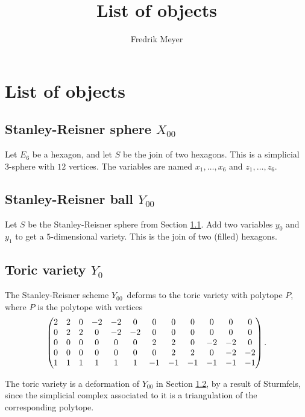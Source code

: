 \documentclass[11pt, english]{article}
\begin{document}
\title{List of objects}
\author{Fredrik Meyer}
\maketitle

\tableofcontents 

\section{List of objects}

\subsection{Stanley-Reisner sphere $X_{00}$}
\label{sec:x00}

Let $E_6$ be a hexagon, and let $S$ be the join of two hexagons. This is a simplicial 3-sphere with $12$ vertices. The variables are named $x_1,\ldots,x_6$ and $z_1,\ldots,z_6$.

\subsection{Stanley-Reisner ball $Y_{00}$}
\label{sec:y00}

Let $S$ be the Stanley-Reisner sphere from Section \ref{sec:x00}. Add two variables $y_0$ and $y_1$ to get a $5$-dimensional variety. This is the join of two (filled) hexagons.

\subsection{Toric variety $Y_0$}
\label{sec:y0}

The Stanley-Reisner scheme $Y_{00}$ deforms to the toric variety with polytope $P$, where $P$ is the polytope with vertices 
\[
\setcounter{MaxMatrixCols}{20}
\begin{pmatrix}
2 & 2 & 0 & -2 & -2 & 0 & 0 & 0 & 0 & 0 & 0 & 0 \\
0 & 2 & 2 & 0  & -2 & -2 & 0 & 0 & 0 & 0 & 0 & 0 \\
0 & 0 & 0 & 0  &  0 &  0 & 2 & 2 & 0 &-2 & -2 & 0 \\
0 & 0 & 0 & 0  &  0 &  0 & 0 & 2 & 2 & 0 & -2 & -2 \\
1 & 1 & 1 & 1  & 1 &   1 & -1 & -1 & -1 & -1 & -1 & -1
\end{pmatrix}.
\]

The toric variety is a deformation of $Y_{00}$ in Section \ref{sec:y00}, by a result of Sturmfels, since the simplicial complex associated to it is a triangulation of the corresponding polytope. 
\end{document}
